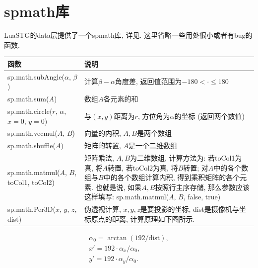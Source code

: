 \section{spmath库}

LuaSTG的data层提供了一个spmath库,
详见.
这里省略一些用处很小或者有bug的函数.

\begin{center}
  \begin{xltabular}{\textwidth}{XX}
    \toprule
    函数 & 说明 \\
    \midrule

    sp.math.subAngle($\alpha$, $\beta$) &
    计算$\beta-\alpha$角度差,
    返回值范围为$-180<\cdot\le180$ \\

    sp.math.sum($A$) &
    数组$A$各元素的和 \\

    sp.math.circle($r$, $\alpha$, $x=0$, $y=0$) &
    与$(x,y)$距离为$r$, 方位角为$\alpha$的坐标
    (返回两个数值) \\

    sp.math.vecmul($A$, $B$) &
    向量的内积, $A,B$是两个数组 \\

    sp.math.shuffle($A$) &
    矩阵的转置, $A$是一个二维数组 \\

    sp.math.matmul($A$, $B$, toCol1, toCol2) &
    矩阵乘法, $A,B$为二维数组, 计算方法为:
    若toCol1为真, 将$A$转置,
    若toCol2为真, 将$B$转置;
    对$A$中的各个数组与$B$中的各个数组计算内积,
    得到乘积矩阵的各个元素.
    也就是说, 如果$A,B$按照行主序存储,
    那么参数应该这样填写:
    sp.math.matmul($A$, $B$, false, true) \\

    sp.math.Per3D($x$, $y$, $z$, dist) &
    伪透视计算, $x,y,z$是要投影的坐标,
    dist是摄像机与坐标原点的距离,
    计算原理如下图所示. \\
    \bottomrule
  \end{xltabular}
\end{center}

\begin{center}
  \begin{align*}
    \alpha_0 = \arctan(192/\text{dist}), \\
    x' = 192\cdot \alpha_x / \alpha_0, \\
    y' = 192\cdot \alpha_y / \alpha_0.
  \end{align*}
\end{center}
